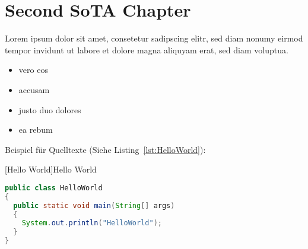 \section{Second SoTA Chapter}
\label{sec:SoTA:second}

Lorem ipsum dolor sit amet, consetetur sadipscing elitr, sed diam nonumy eirmod tempor invidunt ut labore et dolore magna aliquyam erat, sed diam voluptua. 

\begin{itemize}
\item vero eos
\item accusam
\item justo duo dolores
\item ea rebum
\end{itemize}


Beispiel für Quelltexte (Siehe Listing~\ref{lst:HelloWorld}):

\begin{minipage}{\textwidth}
  [Hello World]{Hello World \cite{coder.2009}} %
  \vspace{-3pt}
  \begin{lstlisting}[language=java,label=lst:HelloWorld]
public class HelloWorld
{
  public static void main(String[] args)
  {
    System.out.println("HelloWorld");
  }
}
  \end{lstlisting}
\end{minipage}
